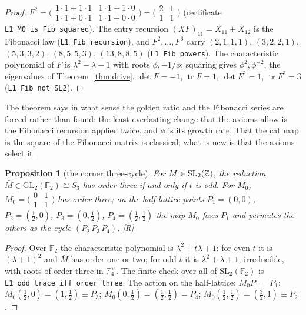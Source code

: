 \documentclass[11pt,a4paper]{article}
\theoremstyle{plain}
\newtheorem{proposition}[theorem]{Proposition}
\theoremstyle{definition}
\theoremstyle{remark}
\newcommand{\rigR}{[\textup{R}]}
\begin{document}
\begin{proof}
$F^{2}=\bigl(\begin{smallmatrix}1\cdot1+1\cdot1&1\cdot1+1\cdot0\\1\cdot1+0\cdot1&1\cdot1+0\cdot0\end{smallmatrix}\bigr)=\bigl(\begin{smallmatrix}2&1\\1&1\end{smallmatrix}\bigr)$ (certificate \texttt{L1\_M0\_is\_Fib\_squared}). The entry recursion $(XF)_{11}=X_{11}+X_{12}$ is the Fibonacci law (\texttt{L1\_Fib\_recursion}), and $F^{2},\dots,F^{6}$ carry $(2,1,1,1)$, $(3,2,2,1)$, $(5,3,3,2)$, $(8,5,5,3)$, $(13,8,8,5)$ (\texttt{L1\_Fib\_powers}). The characteristic polynomial of $F$ is $\lambda^{2}-\lambda-1$ with roots $\phi,-1/\phi$; squaring gives $\phi^{2},\phi^{-2}$, the eigenvalues of Theorem~\ref{thm:drive}. $\det F=-1$, $\operatorname{tr}F=1$, $\det F^{2}=1$, $\operatorname{tr}F^{2}=3$ (\texttt{L1\_Fib\_not\_SL2}).
\end{proof}

The theorem says in what sense the golden ratio and the Fibonacci series are forced rather than found: the least everlasting change that the axioms allow is the Fibonacci recursion applied twice, and $\phi$ is its growth rate. That the cat map is the square of the Fibonacci matrix is classical; what is new is that the axioms select it.

\begin{proposition}[the corner three-cycle]\label{prop:threecycle}
For $M\in\mathrm{SL}_{2}(\mathbb{Z})$, the reduction $\bar M\in\mathrm{GL}_{2}(\mathbb{F}_{2})\cong S_{3}$ has order three if and only if $t$ is odd. For $M_{0}$, $\bar M_{0}=\bigl(\begin{smallmatrix}0&1\\1&1\end{smallmatrix}\bigr)$ has order three; on the half-lattice points $P_{1}=(0,0)$, $P_{2}=(\tfrac12,0)$, $P_{3}=(0,\tfrac12)$, $P_{4}=(\tfrac12,\tfrac12)$ the map $M_{0}$ fixes $P_{1}$ and permutes the others as the cycle $(P_{2}\,P_{3}\,P_{4})$. \rigR
\end{proposition}

\begin{proof}
Over $\mathbb{F}_{2}$ the characteristic polynomial is $\lambda^{2}+\bar t\lambda+1$: for even $t$ it is $(\lambda+1)^{2}$ and $\bar M$ has order one or two; for odd $t$ it is $\lambda^{2}+\lambda+1$, irreducible, with roots of order three in $\mathbb{F}_{4}^{\times}$. The finite check over all of $\mathrm{SL}_{2}(\mathbb{F}_{2})$ is \texttt{L1\_odd\_trace\_iff\_order\_three}. The action on the half-lattice: $M_{0}P_{1}=P_{1}$; $M_{0}(\tfrac12,0)=(1,\tfrac12)\equiv P_{3}$; $M_{0}(0,\tfrac12)=(\tfrac12,\tfrac12)=P_{4}$; $M_{0}(\tfrac12,\tfrac12)=(\tfrac32,1)\equiv P_{2}$.
\end{proof}
\end{document}
